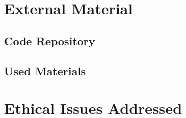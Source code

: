 \begin{appendices}
\chapter{External Material}

\section{Code Repository}

\section{Used Materials}

\chapter{Ethical Issues Addressed}

\end{appendices}
